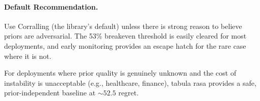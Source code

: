 \paragraph{Default Recommendation.}
Use Corralling (the library's default) unless there is strong reason
to believe priors are adversarial.  The 53\% breakeven threshold is
easily cleared for most deployments, and early monitoring provides an
escape hatch for the rare case where it is not.

For deployments where prior quality is genuinely unknown and the cost
of instability is unacceptable (e.g., healthcare, finance), tabula
rasa provides a safe, prior-independent baseline at ${\sim}52.5$ regret.
